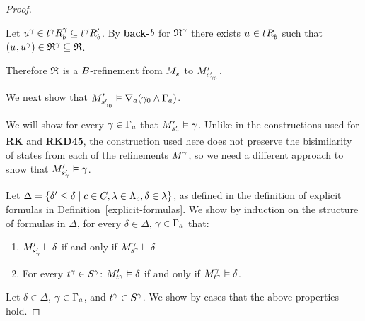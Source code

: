 \begin{proof}
\begin{description}
\begin{description}
                Let $\kStateU[\gamma] \in \kSuccessorsB[\gamma]{\kStateT[\gamma]} \subseteq \kSuccessorsPB{\kStateT[\gamma]}$.
                By {\bf back-$\agentB$} for $\refinement^\gamma$ there exists $\kStateU \in \kSuccessorsB{\kStateT}$ such that $(\kStateU, \kStateU[\gamma]) \in \refinement^\gamma \subseteq \refinement$.
        \end{description}
\end{description}

Therefore $\refinement$ is a $\agentsB$-refinement from $\kPModel{\kStateS}$ to $\kPModelP{\kStateSP_{\gamma_0}}$.

We next show that $\kPModelP{\kStateSP_{\gamma_0}} \entails \coversA (\gamma_0 \land \Gamma_\agentA)$.

We will show for every $\gamma \in \Gamma_\agentA$ that $\kPModelP{\kStateSP_\gamma} \entails \gamma$.
Unlike in the constructions used for {\bf RK} and {\bf RKD45}, the construction used here does not preserve the bisimilarity of states from each of the refinements $\kModel[\gamma]$, so we need a different approach to show that $\kPModelP{\kStateSP_\gamma} \entails \gamma$.

Let $\Delta = \{\delta' \leq \delta \mid \agentC \in \agentsC, \lambda \in \Lambda_\agentC, \delta \in \lambda\}$, as defined in the definition of explicit formulas in Definition~\ref{explicit-formulas}.
We show by induction on the structure of formulas in $\Delta$, for every $\delta \in \Delta$, $\gamma \in \Gamma_\agentA$ that:
\begin{enumerate}
    \item $\kPModelP{\kStateSP_\gamma} \entails \delta$ if and only if $\kPModel[\gamma]{\kStateS[\gamma]} \entails \delta$
    \item For every $\kStateT[\gamma] \in \kStates[\gamma]$: $\kPModelP{\kStateT[\gamma]} \entails \delta$ if and only if $\kPModel[\gamma]{\kStateT[\gamma]} \entails \delta$.
\end{enumerate}

Let $\delta \in \Delta$, $\gamma \in \Gamma_\agentA$, and $\kStateT[\gamma] \in \kStates[\gamma]$.
We show by cases that the above properties hold.


\end{proof}
